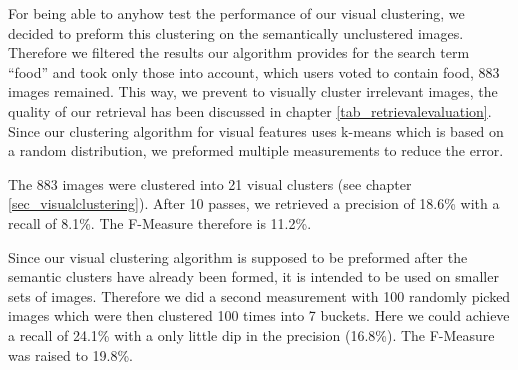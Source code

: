 For being able to anyhow test the performance of our visual clustering, we decided to preform this clustering on the semantically unclustered images. 
Therefore we filtered the results our algorithm provides for the search term ``food'' and took only those into account, which users voted to contain food, 883 images remained. 
This way, we prevent to visually cluster irrelevant images, the quality of our retrieval has been discussed in chapter \ref{tab_retrievalevaluation}. 
Since our clustering algorithm for visual features uses k-means which is based on a random distribution, we preformed multiple measurements to reduce the error. 

The 883 images were clustered into 21 visual clusters (see chapter \ref{sec_visualclustering}). After 10 passes, we retrieved a precision of 18.6\% with a recall of 8.1\%. The F-Measure therefore is 11.2\%.

Since our visual clustering algorithm is supposed to be preformed after the semantic clusters have already been formed, it is intended to be used on smaller sets of images. Therefore we did a second measurement with 100 randomly picked images which were then clustered 100 times into 7 buckets. Here we could achieve a recall of 24.1\% with a only little dip in the precision (16.8\%). The F-Measure was raised to 19.8\%.


\iffalse{begin comment}
Analysis data:

100 images, 7 visual clusters (average over 100x):
  Testset contains  1841 visually similar   image tuples 
  And there are    10894 visually different image tuples 

  Similar   images, average true  positives: 3.140000 
  Similar   images, average false negatives: 9.860000 
  Different images, average true  negatives: 71.490000 
  Different images, average false positives: 15.510000 

  Precision: 0.168365 (tp / (tp + fp))
  Recall:    0.241538 (tp / (tp + fn))
  F-Measure: 0.198420 (2 * (p * r / (p + r)))

all 883 images, 21 visual clusters (average over 10x):
  Testset contains  1841 visually similar   image tuples 
  And there are    10894 visually different image tuples 

  Similar   images, average true  positives: 95.800000 
  Similar   images, average false negatives: 1086.200000 
  Different images, average true  negatives: 6012.100000 
  Different images, average false positives: 417.900000 

  Precision: 0.186490 (tp / (tp + fp))
  Recall:    0.081049 (tp / (tp + fn))
  F-Measure: 0.112992 (2 * (p * r / (p + r)))
\fi




